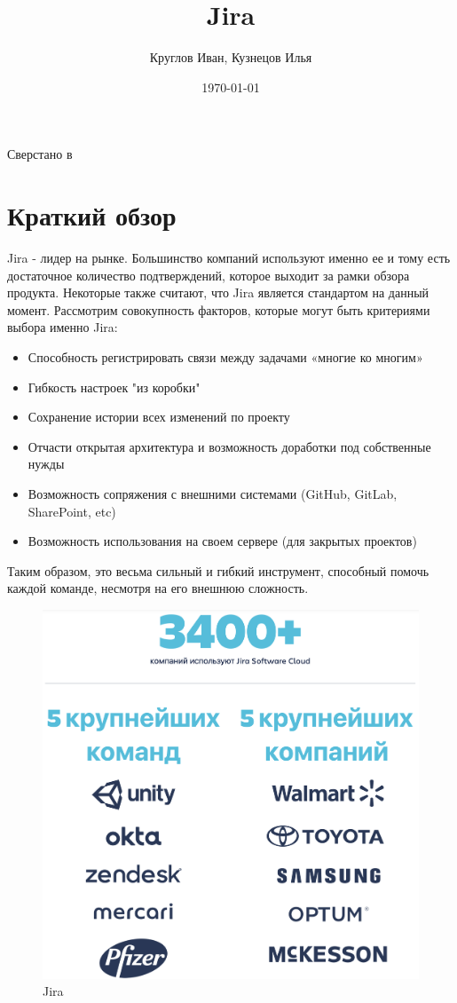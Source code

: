 \documentclass[12pt, a4paper]{article}
\author{Круглов Иван, Кузнецов Илья}
\title{\textbf{Jira}}
\date{\today}
\begin{document}
    \begin{Huge}
        \maketitle
    \end{Huge}
    \null
    \vfill
    \begin{turn}{-45} 
        \Huge{Сверстано в \XeLaTeX}
    \end{turn}
    \newpage
    \tableofcontents
    
    \newpage
    \section{Краткий обзор}
    Jira - лидер на рынке. Большинство компаний используют именно ее и тому есть
    достаточное количество подтверждений, которое выходит за рамки обзора продукта.
    Некоторые также считают, что Jira является стандартом на данный момент.
    Рассмотрим совокупность факторов, которые могут быть критериями выбора именно Jira:
    \begin{itemize}
        \item Способность регистрировать связи между задачами «многие ко многим»
        \item Гибкость настроек "из коробки"
        \item Сохранение истории всех изменений по проекту
        \item Отчасти открытая архитектура и возможность доработки под собственные нужды
        \item Возможность сопряжения с внешними системами (GitHub, GitLab, SharePoint, etc)
        \item Возможность использования на своем сервере (для закрытых проектов)
    \end{itemize}
    Таким образом, это весьма сильный и гибкий инструмент, способный помочь каждой команде, 
    несмотря на его внешнюю сложность.
    \begin{figure}[H]
        \centering
        \includegraphics[width=0.75\linewidth]{src/1.png}
        \caption{Jira}
    \end{figure}
\end{document}
